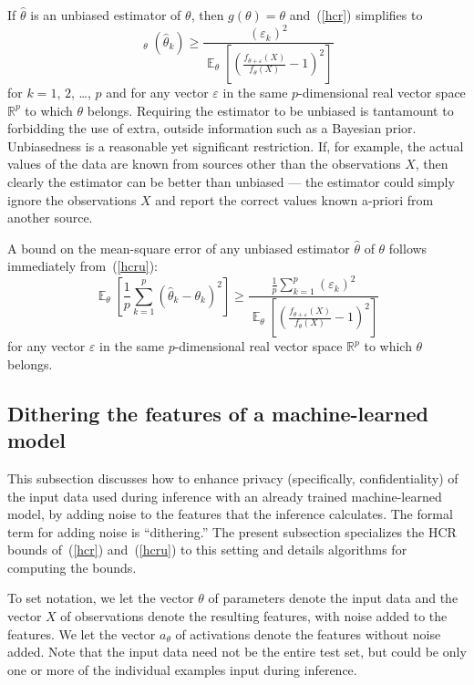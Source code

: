 \documentclass[]{fairmeta}
\DeclareMathOperator{\E}{\mathop{}\mathbb{E}}
\DeclareMathOperator{\var}{\mathop{}{Var}}
\renewcommand{\epsilon}{\varepsilon}
\begin{document}
If $\hat\theta$ is an unbiased estimator of $\theta$, then $g(\theta) = \theta$
and~(\ref{hcr}) simplifies to
%
\begin{equation}
\label{hcru}
\var_{\theta}(\hat\theta_k)
\ge \frac{(\epsilon_k)^2}{\E_{\theta}\left[\left(
          \frac{f_{\theta + \epsilon}(X)}{f_{\theta}(X)} - 1\right)^2 \right]}
\end{equation}
%
for $k = 1$, $2$, \dots, $p$
and for any vector $\epsilon$ in the same $p$-dimensional real vector space
$\mathbb{R}^p$ to which $\theta$ belongs.
Requiring the estimator to be unbiased is tantamount to forbidding
the use of extra, outside information such as a Bayesian prior.
Unbiasedness is a reasonable yet significant restriction.
If, for example, the actual values of the data are known from sources
other than the observations $X$, then clearly the estimator can be better
than unbiased --- the estimator could simply ignore the observations $X$
and report the correct values known a-priori from another source.

A bound on the mean-square error of any unbiased estimator $\hat{\theta}$
of $\theta$ follows immediately from~(\ref{hcru}):
%
\begin{equation}
\label{mse}
\E_{\theta}\left[ \frac{1}{p} \sum_{k=1}^p (\hat\theta_k - \theta_k)^2 \right]
\ge \frac{\frac{1}{p} \sum_{k=1}^p (\epsilon_k)^2}{\E_{\theta}\left[\left(
          \frac{f_{\theta + \epsilon}(X)}{f_{\theta}(X)} - 1\right)^2 \right]}
\end{equation}
%
for any vector $\epsilon$ in the same $p$-dimensional real vector space
$\mathbb{R}^p$ to which $\theta$ belongs.


\subsection{Dithering the features of a machine-learned model}
\label{outputs}

This subsection discusses how to enhance privacy
(specifically, confidentiality) of the input data used
during inference with an already trained machine-learned model,
by adding noise to the features that the inference calculates.
The formal term for adding noise is ``dithering.''
The present subsection specializes the HCR bounds of~(\ref{hcr})
and~(\ref{hcru}) to this setting and details algorithms
for computing the bounds.

To set notation, we let the vector $\theta$ of parameters denote the input data
and the vector $X$ of observations denote the resulting features,
with noise added to the features.
We let the vector $a_{\theta}$ of activations denote the features
without noise added.
Note that the input data need not be the entire test set, but
could be only one or more of the individual examples input during inference.
\end{document}
